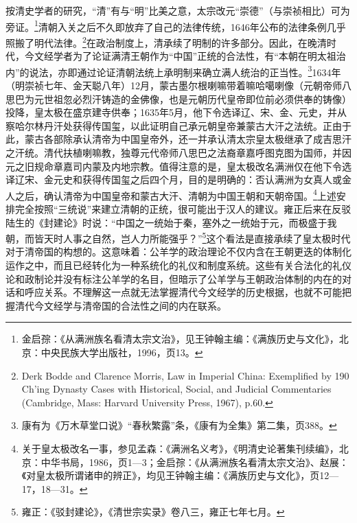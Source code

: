 \documentclass[a4paper, 12pt, openright]{ctexbook}
\begin{document}
按清史学者的研究，“清”有与“明”比美之意，太宗改元“崇德”（与崇祯相比）可为旁证。\footnote{金启孮：《从满洲族名看清太宗文治》，见王钟翰主编：《满族历史与文化》，北京：中央民族大学出版社，1996，页13。}清朝入关之后不久即放弃了自己的法律传统，1646年公布的法律条例几乎照搬了明代法律。\footnote{Derk Bodde and Clarence Morris, Law in Imperial China: Exemplified by 190 Ch'ing Dynasty Cases with Historical, Social, and Judicial Commentaries (Cambridge, Mass: Harvard University Press, 1967), p.60.}在政治制度上，清承续了明制的许多部分。因此，在晚清时代，今文经学者为了论证满清王朝作为“中国”正统的合法性，有“本朝在明太祖治内”的说法，亦即通过论证清朝法统上承明制来确立满人统治的正当性。\footnote{康有为《万木草堂口说》“春秋繁露”条，《康有为全集》第二集，页388。}1634年（明崇祯七年、金天聪八年）12月，蒙古墨尔根喇嘛带着嘛哈噶喇像（元朝帝师八思巴为元世祖忽必烈汗铸造的金佛像，也是元朝历代皇帝即位前必须供奉的铸像）投降，皇太极在盛京建寺供奉；1635年5月，他下令选译辽、宋、金、元史，并从察哈尔林丹汗处获得传国玺，以此证明自己承元朝皇帝兼蒙古大汗之法统。正由于此，蒙古各部除承认清帝为中国皇帝外，还一并承认清太宗皇太极继承了成吉思汗之汗统。清代扶植喇嘛教，独尊元代帝师八思巴之法裔章嘉呼图克图为国师，并因元之旧规命章嘉司内蒙及内地宗教。值得注意的是，皇太极改名满洲仅在他下令选译辽宋、金元史和获得传国玺之后四个月，目的是明确的：否认满洲为女真人或金人之后，确认清帝为中国皇帝和蒙古大汗、清朝为中国王朝和天朝帝国。\footnote{关于皇太极改名一事，参见孟森：《满洲名义考》，《明清史论著集刊续编》，北京：中华书局，1986，页1—3；金启孮：《从满洲族名看清太宗文治》、赵展：《对皇太极所谓诸申的辨正》，均见王钟翰主编：《满族历史与文化》，页12—17，18—31。}上述安排完全按照“三统说”来建立清朝的正统，很可能出于汉人的建议。雍正后来在反驳陆生的《封建论》时说：“中国之一统始于秦，塞外之一统始于元，而极盛于我朝，而皆天时人事之自然，岂人力所能强乎？”\footnote{雍正：《驳封建论》，《清世宗实录》卷八三，雍正七年七月。}这个看法是直接承续了皇太极时代对于清帝国的构想的。这意味着：公羊学的政治理论不仅内含在王朝更迭的体制化运作之中，而且已经转化为一种系统化的礼仪和制度系统。这些有关合法化的礼仪论和政制论并没有标注公羊学的名目，但暗示了公羊学与王朝政治体制的内在的对话和呼应关系。不理解这一点就无法掌握清代今文经学的历史根据，也就不可能把握清代今文经学与清帝国的合法性之间的内在联系。
\end{document}
